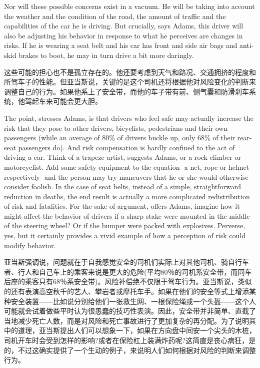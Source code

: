 \documentclass[cs4size, a4paper,12pt]{article}
\newcounter{numpar}
\newcommand*{\newpar}{\numpar{}}
\begin{document}
\newpar Nor will these possible concerns exist in a vacuum. He will be taking into account the weather and the condition of the road, the amount of traffic and the capabilities of the car he is driving. But crucially, says Adams, this driver will also be adjusting his behavior in response to what he perceives are changes in risks. If he is wearing a seat belt and his car has front and side air bags and anti-skid brakes to boot, he may in turn drive a bit more daringly.

这些可能的担心也不是孤立存在的。他还要考虑到天气和路况、交通拥挤的程度和所驾车子的性能。但亚当斯说，关键的是这个司机还将根据他对风险变化的判断来调整自己的行为。如果他系上了安全带，而他的车子带有前、侧气囊和防滑刹车系统，他驾起车来可能会更大胆。

\newpar The point, stresses Adams, is that drivers who feel safe may actually increase the risk that they pose to other drivers, bicyclists, pedestrians and their own passengers (while an average of 80\% of drivers buckle up, only 68\% of their rear-seat passengers do). And risk compensation is hardly confined to the act of driving a car. Think of a trapeze artist,  suggests Adams, or a rock climber or motorcyclist. Add some safety equipment to the equation- a net, rope or helmet respectively- and the person may try maneuvers that he or she would otherwise consider foolish. In the case of seat belts, instead of a simple, straightforward reduction in deaths, the end result is actually a more complicated redistribution of risk and fatalities. For the sake of argument, offers Adams, imagine how it might affect the behavior of drivers if a sharp stake were mounted in the middle of the steering wheel? Or if the bumper were packed with explosives. Perverse, yes, but it certainly provides a vivid example of how a perception of risk could modify behavior.

亚当斯强调说，问题就在于自我感觉安全的司机们实际上对其他司机、骑自行车者、行人和自己车上的乘客来说是更大的危险(平均80％的司机系安全带，而同车后座的乘客只有68％系安全带)。风险补偿绝不仅限于驾车行为。亚当斯说，类似的还有表演高空秋千的艺人、攀岩者或摩托车手。如果在他们的安全等式上增添某种安全装置——比如说分别给他们一张救生网、一根保险绳或一个头盔——这个人可能就会试着做些平时认为很愚蠢的技巧性表演。因此，安全带并非简单、直截了当地减少死亡人数，而是对风险和死亡事故进行了更加复杂的再分配。为了说明其中的道理，亚当斯提出人们可以想象一下，如果在方向盘中间安一个尖头的木桩，司机开车时会受到怎样的影响?或者在保险杠上装满炸药呢?这简直是丧心病狂，是的，不过这确实提供了一个生动的例子，来说明人们如何根据对风险的判断来调整行为。
\end{document}
